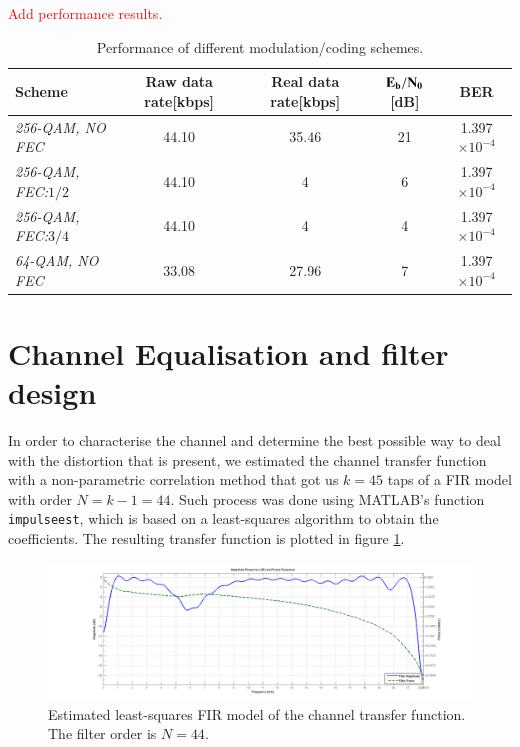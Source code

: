 \documentclass[12pt,a4paper,openright]{report}
\begin{document}
\textcolor{red}{Add performance results.}
\begin{table} [h]
\centering
\begin{tabular}{lcccc} 
\hline
\bf{Scheme} 				       & \bf{Raw data rate}\textnormal{[kbps]}    & \bf{Real data rate}\textnormal{[kbps]} & ${{\text{\bf E}}_{\text{\bf b}}}/{{\text{\bf N}}_{\text{\bf 0}}}$ [dB] &\bf{BER} \\
\hline
\emph{256-QAM, NO FEC}           & 44.10            & 35.46      & 21        & 1.397$\times 10^{-4}$      \\
\emph{256-QAM, FEC:$1/2$}        & 44.10            & 4          & 6       & 1.397$\times 10^{-4}$                      \\
\emph{256-QAM, FEC:$3/4$}        & 44.10            & 4          & 4      & 1.397$\times 10^{-4}$\\
\hline
\emph{64-QAM, NO FEC}            & 33.08           & 27.96       & 7     & 1.397$\times 10^{-4}$  \\
\hline
\end{tabular}
\caption[Performance of different modulation/coding schemes]{Performance of different modulation/coding schemes.}
\label{table:Rates}
\end{table}




\section{Channel Equalisation and filter design}
\label{sec:EQdesign}
In order to characterise the channel and determine the best possible way to deal with the distortion that is present, we estimated the channel transfer function with a non-parametric correlation method that got us $k=45$ taps of a FIR model with order $N=k-1=44$. Such process was done using MATLAB's function \texttt{impulseest}, which is based on a least-squares algorithm to obtain the coefficients. The resulting transfer function is plotted in figure \ref{fig:FIRtf}. 
 
 
\begin{figure}[h]
  \centering
    \includegraphics[width=1\textwidth]{FIRChanRespose.png}
    \caption[Estimated least-squares FIR model for the channel transfer function]{Estimated least-squares FIR model of the channel transfer function. The filter order is $N=44$.}
    \label{fig:FIRtf}
\end{figure}
\end{document}
